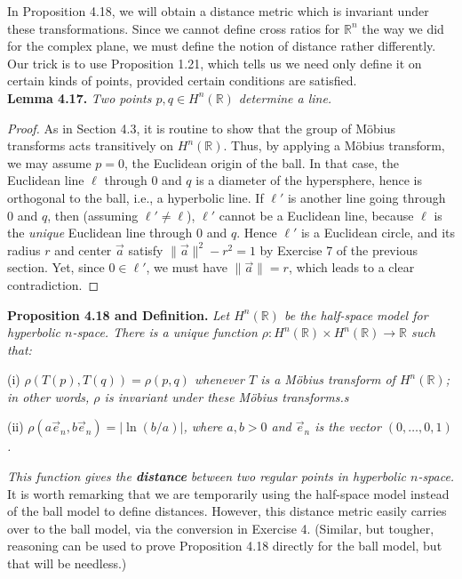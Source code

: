 \documentclass[leqno]{book}
\begin{document}
In Proposition 4.18, we will obtain a distance metric which is invariant under these transformations.  Since we cannot define cross ratios for $\mathbb R^n$ the way we did for the complex plane, we must define the notion of distance rather differently.  Our trick is to use Proposition 1.21, which tells us we need only define it on certain kinds of points, provided certain conditions are satisfied.\\

\noindent\textbf{Lemma 4.17.} \emph{Two points $p,q\in H^n(\mathbb R)$ determine a line.}
\begin{proof}
As in Section 4.3, it is routine to show that the group of M\"obius transforms acts transitively on $H^n(\mathbb R)$.  Thus, by applying a M\"obius transform, we may assume $p=0$, the Euclidean origin of the ball.  In that case, the Euclidean line $\ell$ through $0$ and $q$ is a diameter of the hypersphere, hence is orthogonal to the ball, i.e., a hyperbolic line.  If $\ell'$ is another line going through $0$ and $q$, then (assuming $\ell'\ne\ell$), $\ell'$ cannot be a Euclidean line, because $\ell$ is the \emph{unique} Euclidean line through $0$ and $q$.  Hence $\ell'$ is a Euclidean circle, and its radius $r$ and center $\vec a$ satisfy $\|\vec a\|^2-r^2=1$ by Exercise 7 of the previous section.  Yet, since $0\in\ell'$, we must have $\|\vec a\|=r$, which leads to a clear contradiction.
\end{proof}
\noindent\textbf{Proposition 4.18 and Definition.} \emph{Let $H^n(\mathbb R)$ be the half-space model for hyperbolic $n$-space.  There is a unique function $\rho:H^n(\mathbb R)\times H^n(\mathbb R)\to\mathbb R$ such that:}

(i) \emph{$\rho(T(p),T(q))=\rho(p,q)$ whenever $T$ is a M\"obius transform of $H^n(\mathbb R)$; in other words, $\rho$ is invariant under these M\"obius transforms.s}

(ii) \emph{$\rho(a\vec e_n,b\vec e_n)=|\ln(b/a)|$, where $a,b>0$ and $\vec e_n$ is the vector $(0,\dots,0,1)$.} %

\emph{This function gives the \textbf{distance} between two regular points in hyperbolic $n$-space.}\\

\noindent It is worth remarking that we are temporarily using the half-space model instead of the ball model to define distances.  However, this distance metric easily carries over to the ball model, via the conversion in Exercise 4.  (Similar, but tougher, reasoning can be used to prove Proposition 4.18 directly for the ball model, but that will be needless.)
\end{document}
